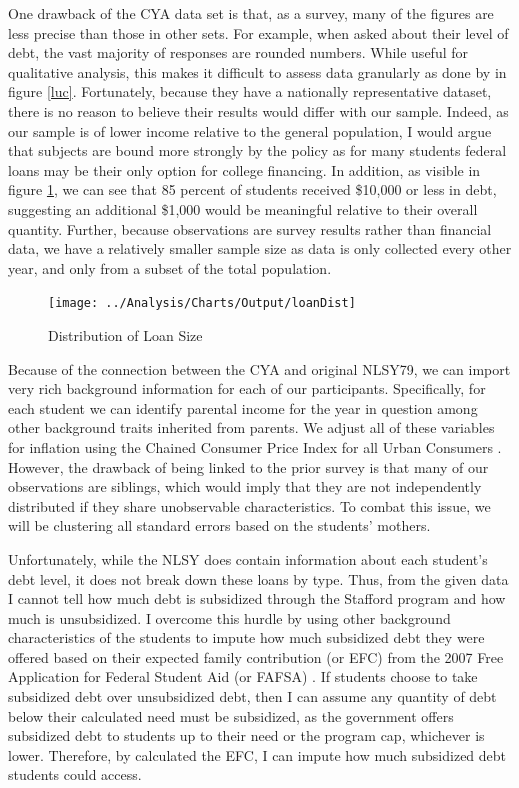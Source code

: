 \documentclass[12pt]{article}
\begin{document}
	One drawback of the CYA data set is that, as a survey, many of the figures are less precise than those in other sets. For example, when asked about their level of debt, the vast majority of responses are rounded numbers. While useful for qualitative analysis, this makes it difficult to assess data granularly as done by \textcite{lucca2018} in figure \ref{luc}. Fortunately, because they have a nationally representative dataset, there is no reason to believe their results would differ with our sample. Indeed, as our sample is of lower income relative to the general population, I would argue that subjects are bound more strongly by the policy as for many students federal loans may be their only option for college financing. In addition, as visible in figure \ref{loanDist}, we can see that 85 percent of students received \$10,000 or less in debt, suggesting an additional \$1,000 would be meaningful relative to their overall quantity. Further, because observations are survey results rather than financial data, we have a relatively smaller sample size as data is only collected every other year, and only from a subset of the total population.
	

	\begin{figure}
		\centering
		\caption{Distribution of Loan Size}
		\label{loanDist}
		\texttt{[image: ../Analysis/Charts/Output/loanDist]}
	\end{figure}

	
	Because of the connection between the CYA and original NLSY79, we can import very rich background information for each of our participants. Specifically, for each student we can identify parental income for the year in question among other background traits inherited from parents. We adjust all of these variables for inflation using the Chained Consumer Price Index for all Urban Consumers \parencite{bls2019}. However, the drawback of being linked to the prior survey is that many of our observations are siblings, which would imply that they are not independently distributed if they share unobservable characteristics. To combat this issue, we will be clustering all standard errors based on the students' mothers. 
	
	Unfortunately, while the NLSY does contain information about each student's debt level, it does not break down these loans by type. Thus, from the given data I cannot tell how much debt is subsidized through the Stafford program and how much is unsubsidized. I overcome this hurdle by using other background characteristics of the students to impute how much subsidized debt they were offered based on their expected family contribution (or EFC) from the 2007 Free Application for Federal Student Aid (or FAFSA) \parencite{doe2007}. If students choose to take subsidized debt over unsubsidized debt, then I can assume any quantity of debt below their calculated need must be subsidized, as the government offers subsidized debt to students up to their need or the program cap, whichever is lower. Therefore, by calculated the EFC, I can impute how much subsidized debt students could access.
	
\end{document}
